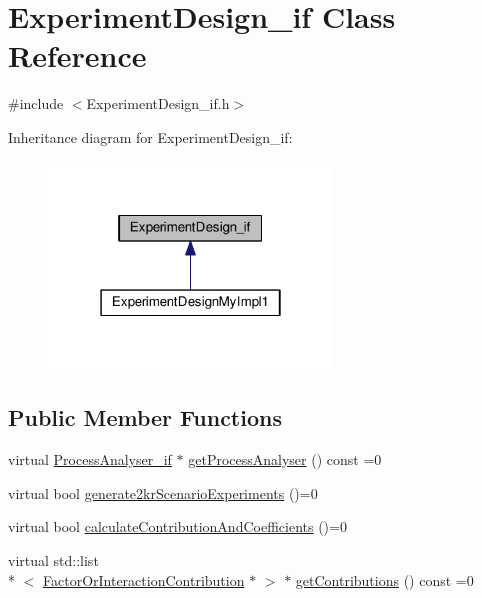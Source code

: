 \hypertarget{class_experiment_design__if}{\section{Experiment\-Design\-\_\-if Class Reference}
\label{class_experiment_design__if}
}


{\ttfamily \#include $<$Experiment\-Design\-\_\-if.\-h$>$}



Inheritance diagram for Experiment\-Design\-\_\-if\-:\nopagebreak
\begin{figure}[H]
\begin{center}
\leavevmode
\includegraphics[width=214pt]{class_experiment_design__if__inherit__graph}
\end{center}
\end{figure}
\subsection*{Public Member Functions}
\begin{DoxyCompactItemize}
\item 
virtual \hyperlink{class_process_analyser__if}{Process\-Analyser\-\_\-if} $\ast$ \hyperlink{class_experiment_design__if_ad3d35aef077b45d683e408ee756d83aa}{get\-Process\-Analyser} () const =0
\item 
virtual bool \hyperlink{class_experiment_design__if_a590a79e47f10294ed9d806baa9a98cba}{generate2kr\-Scenario\-Experiments} ()=0
\item 
virtual bool \hyperlink{class_experiment_design__if_a5e8a8698eaf74121671dd007d7a000e9}{calculate\-Contribution\-And\-Coefficients} ()=0
\item 
virtual std\-::list\\*
$<$ \hyperlink{class_factor_or_interaction_contribution}{Factor\-Or\-Interaction\-Contribution} $\ast$ $>$ $\ast$ \hyperlink{class_experiment_design__if_a249bd184b8326ec6e161321fe6fb7dbe}{get\-Contributions} () const =0
\end{DoxyCompactItemize}


